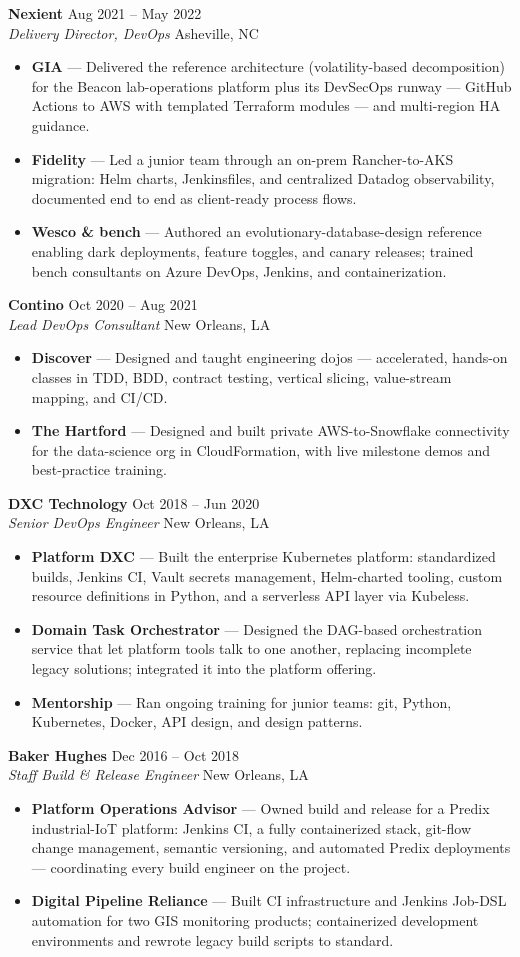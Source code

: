 \documentclass[letterpaper,10pt]{article}
\newcommand{\role}[4]{%
  \par\vspace{8pt}%
  \textbf{\large #1} \hfill {\small\color{muted}#4}\\
  \textit{#3} \hfill {\small\color{muted}#2}\par\vspace{1pt}}
\newenvironment{clients}
  {\begin{itemize}[leftmargin=13pt, itemsep=3pt, topsep=3pt,
                   label=\textcolor{gold}{\textbullet}]}
  {\end{itemize}}
\newcommand{\client}[2]{\item \textbf{#1} — #2}
\newcommand{\sep}{\;\textperiodcentered\;}
\begin{document}
\role{Nexient}{Asheville, NC}{Delivery Director, DevOps}{Aug 2021 -- May 2022}
\begin{clients}
  \client{GIA}{Delivered the reference architecture (volatility-based
    decomposition) for the Beacon lab-operations platform plus its
    DevSecOps runway --- GitHub Actions to AWS with templated Terraform
    modules --- and multi-region HA guidance.}
  \client{Fidelity}{Led a junior team through an on-prem Rancher-to-AKS
    migration: Helm charts, Jenkinsfiles, and centralized Datadog
    observability, documented end to end as client-ready process flows.}
  \client{Wesco \& bench}{Authored an evolutionary-database-design
    reference enabling dark deployments, feature toggles, and canary
    releases; trained bench consultants on Azure DevOps, Jenkins, and
    containerization.}
\end{clients}

\role{Contino}{New Orleans, LA}{Lead DevOps Consultant}{Oct 2020 -- Aug 2021}
\begin{clients}
  \client{Discover}{Designed and taught engineering dojos ---
    accelerated, hands-on classes in TDD, BDD, contract testing,
    vertical slicing, value-stream mapping, and CI/CD.}
  \client{The Hartford}{Designed and built private AWS-to-Snowflake
    connectivity for the data-science org in CloudFormation, with live
    milestone demos and best-practice training.}
\end{clients}

\role{DXC Technology}{New Orleans, LA}{Senior DevOps Engineer}{Oct 2018 -- Jun 2020}
\begin{clients}
  \client{Platform DXC}{Built the enterprise Kubernetes platform:
    standardized builds, Jenkins CI, Vault secrets management,
    Helm-charted tooling, custom resource definitions in Python, and a
    serverless API layer via Kubeless.}
  \client{Domain Task Orchestrator}{Designed the DAG-based orchestration
    service that let platform tools talk to one another, replacing
    incomplete legacy solutions; integrated it into the platform
    offering.}
  \client{Mentorship}{Ran ongoing training for junior teams: git,
    Python, Kubernetes, Docker, API design, and design patterns.}
\end{clients}

\role{Baker Hughes}{New Orleans, LA}{Staff Build \& Release Engineer}{Dec 2016 -- Oct 2018}
\begin{clients}
  \client{Platform Operations Advisor}{Owned build and release for a
    Predix industrial-IoT platform: Jenkins CI, a fully containerized
    stack, git-flow change management, semantic versioning, and
    automated Predix deployments --- coordinating every build engineer
    on the project.}
  \client{Digital Pipeline \sep{} Reliance}{Built CI infrastructure and
    Jenkins Job-DSL automation for two GIS monitoring products;
    containerized development environments and rewrote legacy build
    scripts to standard.}
\end{clients}
\end{document}
